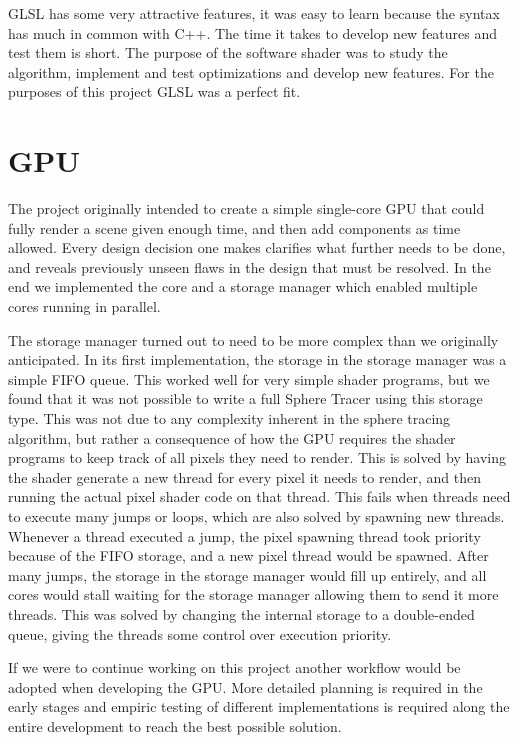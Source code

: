 			GLSL has some very attractive features, it was easy to learn 
			because the syntax has much in common with C++. The time it takes 
			to develop new features and	test them is short. The purpose of the 
			software shader was to study the algorithm, implement and test 
			optimizations and develop new features. For the purposes of this 
			project GLSL was a perfect fit.
		
		\section{GPU} 
		
			The project originally intended to create a simple single-core GPU
			that could fully render a scene given enough time, and then add	
			components as time allowed. Every design decision one makes 
			clarifies what further needs to be done, and reveals previously 
			unseen flaws in the design that must
			be resolved. In the end we implemented the core and a storage 
			manager which enabled multiple cores running in parallel.

			The storage manager turned out to need to be more complex than we 
			originally anticipated. In its first implementation, the storage in
			the storage manager was a simple FIFO queue. This worked well for 
			very simple shader programs, but we found that it was not possible
			to write a full Sphere Tracer using this storage type. This was not
			due to any complexity inherent in the sphere tracing algorithm, but
			rather a consequence of how the GPU requires the shader programs to
			keep track of all pixels they need to render. This is solved by 
			having the shader generate a new thread for every pixel it needs to
			render, and then running the actual pixel shader code on that 
			thread. This fails when threads need to execute many jumps or 
			loops, which are also solved by spawning new threads. Whenever a 
			thread executed a jump, the pixel spawning thread took priority 
			because of the FIFO storage, and a new pixel thread would be 
			spawned. After many jumps, the storage in the storage manager would 
			fill up entirely, and all cores would stall waiting for the 
			storage manager allowing them to send it more threads. This was 
			solved by changing the internal storage to a double-ended queue,
			giving the threads some control over execution priority.

			If we were to continue working on this project another workflow
			would be adopted when developing the GPU. More detailed planning is
			required in the early stages and empiric testing of different
			implementations is required along the entire development to reach
			the best possible solution.

